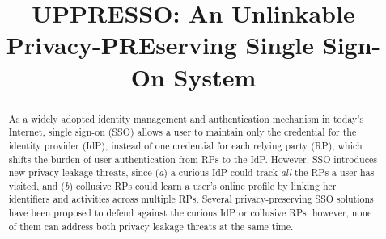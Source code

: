 \documentclass[conference, 10pt]{IEEEtran}
\begin{document}
\title{{UPPRESSO}: An Unlinkable Privacy-PREserving Single Sign-On System}
\maketitle
\begin{abstract}
As a widely adopted identity management and authentication mechanism in today's Internet, single sign-on (SSO)
allows a user to maintain only the credential for the identity provider (IdP), instead of one credential for each relying party (RP), which shifts the burden of user authentication from RPs to the IdP.
However, SSO introduces new privacy leakage threats, since (\emph{a}) a curious IdP could track {\em all} the RPs a user has visited,
and (\emph{b}) collusive RPs could learn a user's online profile by linking her identifiers and activities across multiple RPs.
Several privacy-preserving SSO solutions have been proposed to defend against the curious IdP or collusive RPs, however, none of them can address both privacy leakage threats at the same time.


\end{abstract}
\end{document}
